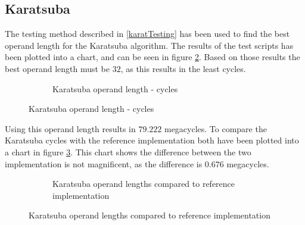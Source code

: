 \subsection{Karatsuba}
The testing method described in \ref{karatTesting} has been used to find the best operand length for the Karatsuba algorithm. The results of the test scripts has been plotted into a chart, and can be seen in figure \ref{karatsubafigure}. Based on those results the best operand length must be $32$, as this results in the least cycles. \\ 
\begin{figure}[H]
\begin{subfigure}{\textwidth}
    \centering
    \caption{Karatsuba operand length - cycles}
\label{karatsubafigure}
\end{subfigure}
\end{figure}
Using this operand length results in $79.222$ megacycles. To compare the Karatsuba cycles with the reference implementation both have been plotted into a chart in figure \ref{karatsubacomparison}. This chart shows the difference between the two implementation is not magnificent, as the difference is $0.676$ megacycles.\\

\begin{figure}[H]
\begin{subfigure}{\textwidth}
    \centering
    \caption{Karatsuba operand lengths compared to reference implementation}
\end{subfigure}
\label{karatsubacomparison}
\end{figure}
    